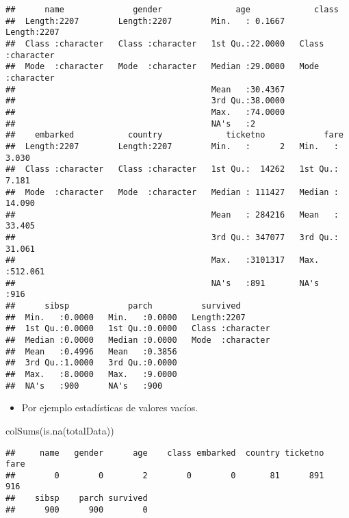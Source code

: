 \documentclass[
]{article}
\newenvironment{Shaded}{\begin{snugshade}}{\end{snugshade}}
\newcommand{\FunctionTok}[1]{\textcolor[rgb]{0.94,0.94,0.56}{#1}}
\newcommand{\NormalTok}[1]{\textcolor[rgb]{0.80,0.80,0.80}{#1}}
\providecommand{\tightlist}{%
  \setlength{\itemsep}{0pt}\setlength{\parskip}{0pt}}
\begin{document}
\begin{verbatim}
##      name              gender               age             class          
##  Length:2207        Length:2207        Min.   : 0.1667   Length:2207       
##  Class :character   Class :character   1st Qu.:22.0000   Class :character  
##  Mode  :character   Mode  :character   Median :29.0000   Mode  :character  
##                                        Mean   :30.4367                     
##                                        3rd Qu.:38.0000                     
##                                        Max.   :74.0000                     
##                                        NA's   :2                           
##    embarked           country             ticketno            fare        
##  Length:2207        Length:2207        Min.   :      2   Min.   :  3.030  
##  Class :character   Class :character   1st Qu.:  14262   1st Qu.:  7.181  
##  Mode  :character   Mode  :character   Median : 111427   Median : 14.090  
##                                        Mean   : 284216   Mean   : 33.405  
##                                        3rd Qu.: 347077   3rd Qu.: 31.061  
##                                        Max.   :3101317   Max.   :512.061  
##                                        NA's   :891       NA's   :916      
##      sibsp            parch          survived        
##  Min.   :0.0000   Min.   :0.0000   Length:2207       
##  1st Qu.:0.0000   1st Qu.:0.0000   Class :character  
##  Median :0.0000   Median :0.0000   Mode  :character  
##  Mean   :0.4996   Mean   :0.3856                     
##  3rd Qu.:1.0000   3rd Qu.:0.0000                     
##  Max.   :8.0000   Max.   :9.0000                     
##  NA's   :900      NA's   :900
\end{verbatim}

\begin{itemize}
\tightlist
\item
  Por ejemplo estadísticas de valores vacíos.
\end{itemize}

\begin{Shaded}
\begin{Highlighting}[]
\FunctionTok{colSums}\NormalTok{(}\FunctionTok{is.na}\NormalTok{(totalData))}
\end{Highlighting}
\end{Shaded}

\begin{verbatim}
##     name   gender      age    class embarked  country ticketno     fare 
##        0        0        2        0        0       81      891      916 
##    sibsp    parch survived 
##      900      900        0
\end{verbatim}
\end{document}
